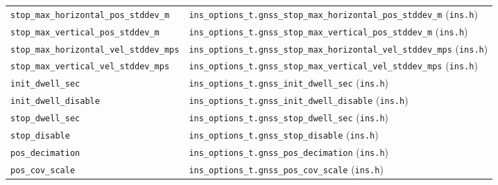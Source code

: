 \documentclass[11pt,a4paper]{article}
\newcommand{\code}[1]{\texttt{#1}}
\begin{document}
\begin{landscape}
\begin{center}
\begin{longtable}{@{}p{6.5cm}p{16.5cm}@{}}
\code{stop\_\allowbreak{}max\_\allowbreak{}horizontal\_\allowbreak{}pos\_\allowbreak{}stddev\_\allowbreak{}m} & \code{ins\_\allowbreak{}options\_\allowbreak{}t.gnss\_\allowbreak{}stop\_\allowbreak{}max\_\allowbreak{}horizontal\_\allowbreak{}pos\_\allowbreak{}stddev\_\allowbreak{}m} (\code{ins.h}) \\
\code{stop\_\allowbreak{}max\_\allowbreak{}vertical\_\allowbreak{}pos\_\allowbreak{}stddev\_\allowbreak{}m} & \code{ins\_\allowbreak{}options\_\allowbreak{}t.gnss\_\allowbreak{}stop\_\allowbreak{}max\_\allowbreak{}vertical\_\allowbreak{}pos\_\allowbreak{}stddev\_\allowbreak{}m} (\code{ins.h}) \\
\code{stop\_\allowbreak{}max\_\allowbreak{}horizontal\_\allowbreak{}vel\_\allowbreak{}stddev\_\allowbreak{}mps} & \code{ins\_\allowbreak{}options\_\allowbreak{}t.gnss\_\allowbreak{}stop\_\allowbreak{}max\_\allowbreak{}horizontal\_\allowbreak{}vel\_\allowbreak{}stddev\_\allowbreak{}mps} (\code{ins.h}) \\
\code{stop\_\allowbreak{}max\_\allowbreak{}vertical\_\allowbreak{}vel\_\allowbreak{}stddev\_\allowbreak{}mps} & \code{ins\_\allowbreak{}options\_\allowbreak{}t.gnss\_\allowbreak{}stop\_\allowbreak{}max\_\allowbreak{}vertical\_\allowbreak{}vel\_\allowbreak{}stddev\_\allowbreak{}mps} (\code{ins.h}) \\
\code{init\_\allowbreak{}dwell\_\allowbreak{}sec}     & \code{ins\_\allowbreak{}options\_\allowbreak{}t.gnss\_\allowbreak{}init\_\allowbreak{}dwell\_\allowbreak{}sec} (\code{ins.h}) \\
\code{init\_\allowbreak{}dwell\_\allowbreak{}disable} & \code{ins\_\allowbreak{}options\_\allowbreak{}t.gnss\_\allowbreak{}init\_\allowbreak{}dwell\_\allowbreak{}disable} (\code{ins.h}) \\
\code{stop\_\allowbreak{}dwell\_\allowbreak{}sec}     & \code{ins\_\allowbreak{}options\_\allowbreak{}t.gnss\_\allowbreak{}stop\_\allowbreak{}dwell\_\allowbreak{}sec} (\code{ins.h}) \\
\code{stop\_\allowbreak{}disable}        & \code{ins\_\allowbreak{}options\_\allowbreak{}t.gnss\_\allowbreak{}stop\_\allowbreak{}disable} (\code{ins.h}) \\
\code{pos\_\allowbreak{}decimation}      & \code{ins\_\allowbreak{}options\_\allowbreak{}t.gnss\_\allowbreak{}pos\_\allowbreak{}decimation} (\code{ins.h}) \\
\code{pos\_\allowbreak{}cov\_\allowbreak{}scale}      & \code{ins\_\allowbreak{}options\_\allowbreak{}t.gnss\_\allowbreak{}pos\_\allowbreak{}cov\_\allowbreak{}scale} (\code{ins.h}) \\

\end{longtable}
\end{center}
\end{landscape}
\end{document}
